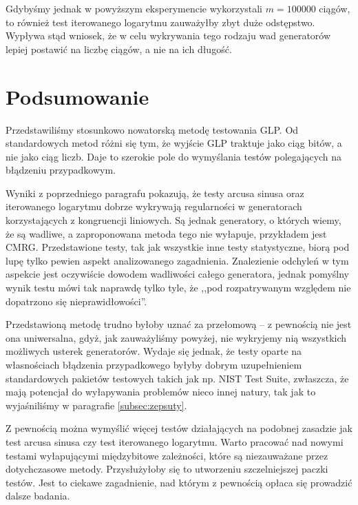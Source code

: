 \documentclass[a4paper,11pt,twoside]{book}
\theoremstyle{definition}
\begin{document}
Gdybyśmy jednak w powyższym eksperymencie wykorzystali $m = 100000$ ciągów, to również test iterowanego logarytmu zauważyłby zbyt duże odstępstwo. Wypływa stąd wniosek, że w celu wykrywania tego rodzaju wad generatorów lepiej postawić na liczbę ciągów, a nie na ich długość.

\FloatBarrier
\newpage
\section{Podsumowanie}
Przedstawiliśmy stosunkowo nowatorską metodę testowania GLP. Od standardowych metod różni się tym, że wyjście GLP traktuje jako ciąg bitów, a nie jako ciąg liczb. Daje to szerokie pole do wymyślania testów polegających na błądzeniu przypadkowym.

Wyniki z poprzedniego paragrafu pokazują, że testy arcusa sinusa oraz iterowanego logarytmu dobrze wykrywają regularności w generatorach korzystających z kongruencji liniowych. Są jednak generatory, o których wiemy, że są wadliwe, a zaproponowana metoda tego nie wyłapuje, przykładem jest CMRG. Przedstawione testy, tak jak wszystkie inne testy statystyczne, biorą pod lupę tylko pewien aspekt analizowanego zagadnienia. Znalezienie odchyleń w tym aspekcie jest oczywiście dowodem wadliwości całego generatora, jednak pomyślny wynik testu mówi tak naprawdę tylko tyle, że ,,pod rozpatrywanym względem nie dopatrzono się nieprawidłowości''.

Przedstawioną metodę trudno byłoby uznać za przełomową -- z pewnością nie jest ona uniwersalna, gdyż, jak zauważyliśmy powyżej, nie wykryjemy nią wszystkich możliwych usterek generatorów. Wydaje się jednak, że testy oparte na własnościach błądzenia przypadkowego byłyby dobrym uzupełnieniem standardowych pakietów testowych takich jak np. NIST Test Suite, zwłaszcza, że mają potencjał do wyłapywania problemów nieco innej natury, tak jak to wyjaśniliśmy w paragrafie \ref{subsec:zepsuty}.

Z pewnością można wymyślić więcej testów działających na podobnej zasadzie jak test arcusa sinusa czy test iterowanego logarytmu. Warto pracować nad nowymi testami wyłapującymi międzybitowe zależności, które są niezauważane przez dotychczasowe metody. Przysłużyłoby się to utworzeniu szczelniejszej paczki testów. Jest to ciekawe zagadnienie, nad którym z pewnością opłaca się prowadzić dalsze badania.
\end{document}
